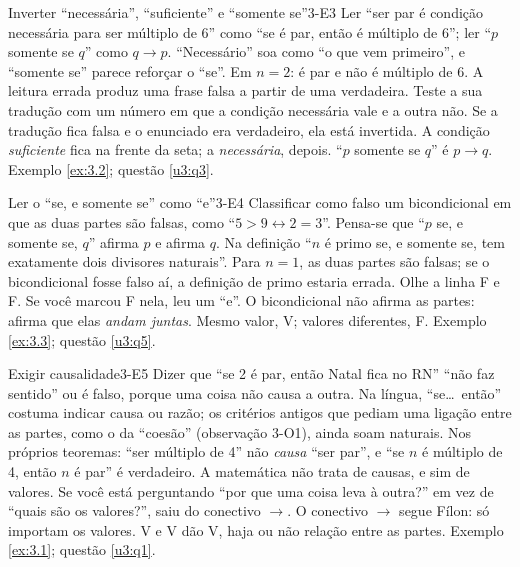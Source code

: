 \begin{erro}{Inverter \enquote{necessária}, \enquote{suficiente} e \enquote{somente se}}{3-E3}
 Ler \enquote{ser par é condição necessária para ser múltiplo de 6} como \enquote{se é par, então é múltiplo de 6}; ler \enquote{$p$ somente se $q$} como $q\rightarrow p$.
 \enquote{Necessário} soa como \enquote{o que vem primeiro}, e \enquote{somente se} parece reforçar o \enquote{se}.
 Em $n=2$: é par e não é múltiplo de 6. A leitura errada produz uma frase falsa a partir de uma verdadeira.
 Teste a sua tradução com um número em que a condição necessária vale e a outra não. Se a tradução fica falsa e o enunciado era verdadeiro, ela está invertida.
 A condição \emph{suficiente} fica na frente da seta; a \emph{necessária}, depois. \enquote{$p$ somente se $q$} é $p\rightarrow q$.
 Exemplo \ref{ex:3.2}; questão \ref{u3:q3}.
\end{erro}

\begin{erro}{Ler o \enquote{se, e somente se} como \enquote{e}}{3-E4}
 Classificar como falso um bicondicional em que as duas partes são falsas, como \enquote{$5>9\leftrightarrow 2=3$}.
 Pensa-se que \enquote{$p$ se, e somente se, $q$} afirma $p$ e afirma $q$.
 Na definição \enquote{$n$ é primo se, e somente se, tem exatamente dois divisores naturais}. Para $n=1$, as duas partes são falsas; se o bicondicional fosse falso aí, a definição de primo estaria errada.
 Olhe a linha F e F. Se você marcou F nela, leu um \enquote{e}.
 O bicondicional não afirma as partes: afirma que elas \emph{andam juntas}. Mesmo valor, V; valores diferentes, F.
 Exemplo \ref{ex:3.3}; questão \ref{u3:q5}.
\end{erro}

\begin{erro}{Exigir causalidade}{3-E5}
 Dizer que \enquote{se 2 é par, então Natal fica no RN} \enquote{não faz sentido} ou é falso, porque uma coisa não causa a outra.
 Na língua, \enquote{se\ldots\ então} costuma indicar causa ou razão; os critérios antigos que pediam uma ligação entre as partes, como o da \enquote{coesão} (observação 3-O1), ainda soam naturais.
 Nos próprios teoremas: \enquote{ser múltiplo de 4} não \emph{causa} \enquote{ser par}, e \enquote{se $n$ é múltiplo de 4, então $n$ é par} é verdadeiro. A matemática não trata de causas, e sim de valores.
 Se você está perguntando \enquote{por que uma coisa leva à outra?} em vez de \enquote{quais são os valores?}, saiu do conectivo $\rightarrow$.
 O conectivo $\rightarrow$ segue Fílon: só importam os valores. V e V dão V, haja ou não relação entre as partes.
 Exemplo \ref{ex:3.1}; questão \ref{u3:q1}.
\end{erro}

